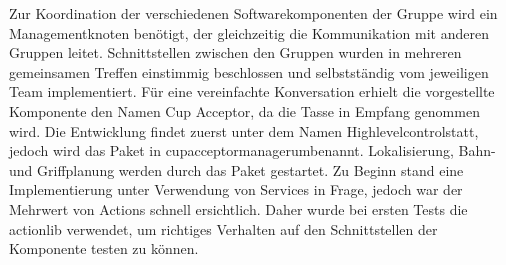 Zur Koordination der verschiedenen Softwarekomponenten der Gruppe wird ein Managementknoten benötigt, der gleichzeitig die Kommunikation mit anderen Gruppen leitet. Schnittstellen zwischen den Gruppen wurden in mehreren gemeinsamen Treffen einstimmig beschlossen und selbstständig vom jeweiligen Team implementiert. Für eine vereinfachte Konversation erhielt die vorgestellte Komponente den Namen \glqq Cup Acceptor\grqq , da die Tasse in Empfang genommen wird. Die Entwicklung findet zuerst unter dem Namen \glqq Highlevelcontrol\grqq statt, jedoch wird das Paket in \glqq cup\textunderscore acceptor\textunderscore manager\grqq umbenannt. Lokalisierung, Bahn- und Griffplanung werden durch das Paket gestartet. Zu Beginn stand eine Implementierung unter Verwendung von Services in Frage, jedoch war der Mehrwert von Actions schnell ersichtlich. Daher wurde bei ersten Tests die actionlib verwendet, um richtiges Verhalten auf den Schnittstellen der Komponente testen zu können.
